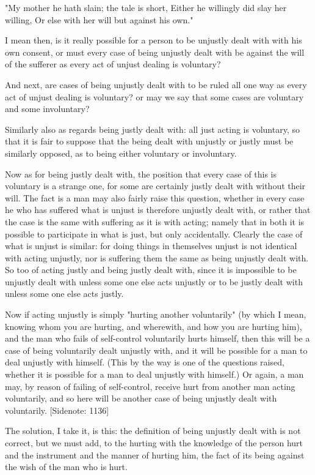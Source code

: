   "My mother he hath slain;  the tale is short,
  Either he willingly did slay her willing,
  Or else with her will but against his own."

I mean then, is it really possible for a person to be unjustly dealt
with with his own consent, or must every case of being unjustly dealt
with be against the will of the sufferer as every act of unjust dealing
is voluntary?

And next, are cases of being unjustly dealt with to be ruled all one way
as every act of unjust dealing is voluntary? or may we say that some
cases are voluntary and some involuntary?

Similarly also as regards being justly dealt with: all just acting is
voluntary, so that it is fair to suppose that the being dealt with
unjustly or justly must be similarly opposed, as to being either
voluntary or involuntary.

Now as for being justly dealt with, the position that every case of this
is voluntary is a strange one, for some are certainly justly dealt
with without their will. The fact is a man may also fairly raise this
question, whether in every case he who has suffered what is unjust is
therefore unjustly dealt with, or rather that the case is the same with
suffering as it is with acting; namely that in both it is possible to
participate in what is just, but only accidentally. Clearly the case of
what is unjust is similar: for doing things in themselves unjust is not
identical with acting unjustly, nor is suffering them the same as being
unjustly dealt with. So too of acting justly and being justly dealt
with, since it is impossible to be unjustly dealt with unless some one
else acts unjustly or to be justly dealt with unless some one else acts
justly.

Now if acting unjustly is simply "hurting another voluntarily" (by which
I mean, knowing whom you are hurting, and wherewith, and how you are
hurting him), and the man who fails of self-control voluntarily hurts
himself, then this will be a case of being voluntarily dealt unjustly
with, and it will be possible for a man to deal unjustly with himself.
(This by the way is one of the questions raised, whether it is possible
for a man to deal unjustly with himself.) Or again, a man may, by
reason of failing of self-control, receive hurt from another man acting
voluntarily, and so here will be another case of being unjustly dealt
with voluntarily. [Sidenote: 1136]

The solution, I take it, is this: the definition of being unjustly dealt
with is not correct, but we must add, to the hurting with the knowledge
of the person hurt and the instrument and the manner of hurting him, the
fact of its being against the wish of the man who is hurt.

